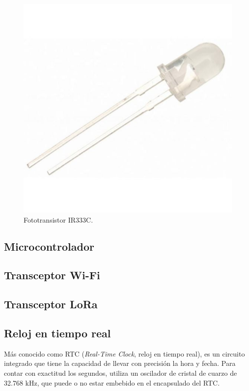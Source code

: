 	\begin{figure}[h]
		\centering
		\includegraphics[scale=0.3]{./Figures/phototransistor.jpg}
		\caption{Fototransistor IR333C.}
		\label{fig:cuadradoAzul}
	\end{figure}

\subsection{Microcontrolador}

\subsection{Transceptor Wi-Fi}


\subsection{Transceptor LoRa}



\subsection{Reloj en tiempo real}

Más conocido como RTC (\textit{Real-Time Clock}, reloj en tiempo real), es un circuito integrado que tiene la capacidad de llevar con precisión la hora y fecha. Para contar con exactitud los segundos, utiliza un oscilador de cristal de cuarzo de 32.768 kHz, que puede o no estar embebido en el encapsulado del RTC.

